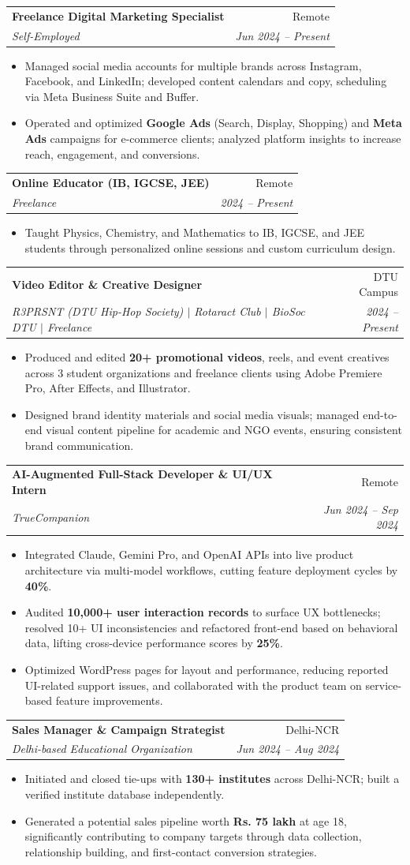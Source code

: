 \documentclass[letterpaper,10.5pt]{article}
\makeatletter
\newcommand{\resumeItem}[1]{
  \item\small{#1 \vspace{-2pt}}
}
\newcommand{\resumeSubheading}[4]{
  \vspace{-2pt}\item
    \begin{tabular*}{0.97\textwidth}[t]{l@{\extracolsep{\fill}}r}
      \textbf{#1} & \small #2 \\
      \textit{\small#3} & \textit{\small #4} \\
    \end{tabular*}\vspace{-5pt}
}
\newcommand{\resumeItemListStart}{\begin{itemize}[leftmargin=0.18in]}
\newcommand{\resumeItemListEnd}{\end{itemize}\vspace{-4pt}}
\makeatother
\begin{document}
  \resumeSubheading
    {Freelance Digital Marketing Specialist}{Remote}
    {Self-Employed}{Jun 2024 -- Present}
    \resumeItemListStart
      \resumeItem{Managed social media accounts for multiple brands across Instagram, Facebook, and LinkedIn; developed content calendars and copy, scheduling via Meta Business Suite and Buffer.}
      \resumeItem{Operated and optimized \textbf{Google Ads} (Search, Display, Shopping) and \textbf{Meta Ads} campaigns for e-commerce clients; analyzed platform insights to increase reach, engagement, and conversions.}
    \resumeItemListEnd

  \resumeSubheading
    {Online Educator (IB, IGCSE, JEE)}{Remote}
    {Freelance}{2024 -- Present}
    \resumeItemListStart
      \resumeItem{Taught Physics, Chemistry, and Mathematics to IB, IGCSE, and JEE students through personalized online sessions and custom curriculum design.}
    \resumeItemListEnd

  \resumeSubheading
    {Video Editor \& Creative Designer}{DTU Campus}
    {R3PRSNT (DTU Hip-Hop Society) $|$ Rotaract Club $|$ BioSoc DTU $|$ Freelance}{2024 -- Present}
    \resumeItemListStart
      \resumeItem{Produced and edited \textbf{20+ promotional videos}, reels, and event creatives across 3 student organizations and freelance clients using Adobe Premiere Pro, After Effects, and Illustrator.}
      \resumeItem{Designed brand identity materials and social media visuals; managed end-to-end visual content pipeline for academic and NGO events, ensuring consistent brand communication.}
    \resumeItemListEnd

  \resumeSubheading
    {AI-Augmented Full-Stack Developer \& UI/UX Intern}{Remote}
    {TrueCompanion}{Jun 2024 -- Sep 2024}
    \resumeItemListStart
      \resumeItem{Integrated Claude, Gemini Pro, and OpenAI APIs into live product architecture via multi-model workflows, cutting feature deployment cycles by \textbf{40\%}.}
      \resumeItem{Audited \textbf{10,000+ user interaction records} to surface UX bottlenecks; resolved 10+ UI inconsistencies and refactored front-end based on behavioral data, lifting cross-device performance scores by \textbf{25\%}.}
      \resumeItem{Optimized WordPress pages for layout and performance, reducing reported UI-related support issues, and collaborated with the product team on service-based feature improvements.}
    \resumeItemListEnd

  \resumeSubheading
    {Sales Manager \& Campaign Strategist}{Delhi-NCR}
    {Delhi-based Educational Organization}{Jun 2024 -- Aug 2024}
    \resumeItemListStart
      \resumeItem{Initiated and closed tie-ups with \textbf{130+ institutes} across Delhi-NCR; built a verified institute database independently.}
      \resumeItem{Generated a potential sales pipeline worth \textbf{Rs. 75 lakh} at age 18, significantly contributing to company targets through data collection, relationship building, and first-contact conversion strategies.}
    \resumeItemListEnd
\end{document}
